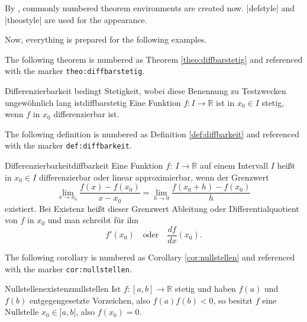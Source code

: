 
By , commonly numbered theorem environments are
created now. |defstyle| and |theostyle| are used for the appearance.

Now, everything is prepared for the following examples.

\begin{dispExample}
The following theorem is numbered as Theorem \ref{theo:diffbarstetig} and
referenced with the marker \texttt{theo:diffbarstetig}.\bigskip

\begin{Theorem}{Differenzierbarkeit bedingt Stetigkeit, wobei diese Benennung
  zu Testzwecken ungew\"{o}hnlich lang ist}{diffbarstetig}%
  Eine Funktion $f:I\to\mathbb{R}$ ist in $x_0\in I$ stetig, wenn $f$ in
  $x_0$ differenzierbar ist.
\end{Theorem}
\end{dispExample}


\begin{dispExample}
The following definition is numbered as Definition \ref{def:diffbarkeit} and
referenced with the marker \texttt{def:diffbarkeit}.\bigskip

\begin{Definition}{Differenzierbarkeit}{diffbarkeit}
  Eine Funktion $f:~I\to\mathbb{R}$ auf einem Intervall $I$ hei\ss{}t in
  $x_0\in I$ differenzierbar oder linear approximierbar,
  wenn der Grenzwert
  \begin{equation*}
  \lim\limits_{x\to x_0}\frac{f(x)-f(x_0)}{x-x_0}=
  \lim\limits_{h\to 0}\frac{f(x_0+h)-f(x_0)}{h}
  \end{equation*}
  existiert. Bei Existenz hei\ss{}t dieser Grenzwert Ableitung
  oder Differentialquotient von $f$ in $x_0$ und man
  schreibt f\"{u}r ihn
  \begin{equation*}
  f'(x_0)\quad\text{oder}\quad\frac{df}{dx}(x_0).
  \end{equation*}
\end{Definition}
\end{dispExample}


\begin{dispExample}
The following corollary is numbered as Corollary \ref{cor:nullstellen} and
referenced with the marker \texttt{cor:nullstellen}.\bigskip

\begin{Corollary}{Nullstellenexistenz}{nullstellen}
  Ist $f:[a,b]\to\mathbb{R}$ stetig und haben $f(a)$ und $f(b)$ entgegengesetzte
  Vorzeichen, also $f(a)f(b)<0$, so besitzt $f$ eine Nullstelle $x_0\in]a,b[$,
  also $f(x_0)=0$.
\end{Corollary}
\end{dispExample}


